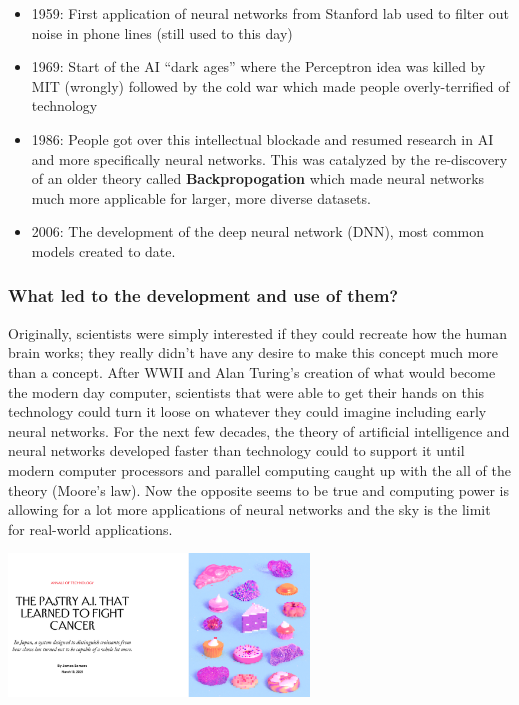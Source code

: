 \documentclass[
]{article}
\providecommand{\tightlist}{%
  \setlength{\itemsep}{0pt}\setlength{\parskip}{0pt}}
\begin{document}
\begin{itemize}
\tightlist
\item
  1959: First application of neural networks from Stanford lab used to
  filter out noise in phone lines (still used to this day)
\item
  1969: Start of the AI ``dark ages'' where the Perceptron idea was
  killed by MIT (wrongly) followed by the cold war which made people
  overly-terrified of technology
\item
  1986: People got over this intellectual blockade and resumed research
  in AI and more specifically neural networks. This was catalyzed by the
  re-discovery of an older theory called \textbf{Backpropogation} which
  made neural networks much more applicable for larger, more diverse
  datasets.
\item
  2006: The development of the deep neural network (DNN), most common
  models created to date.
\end{itemize}

\hypertarget{what-led-to-the-development-and-use-of-them}{%
\subsubsection{What led to the development and use of
them?}\label{what-led-to-the-development-and-use-of-them}}

Originally, scientists were simply interested if they could recreate how
the human brain works; they really didn't have any desire to make this
concept much more than a concept. After WWII and Alan Turing's creation
of what would become the modern day computer, scientists that were able
to get their hands on this technology could turn it loose on whatever
they could imagine including early neural networks. For the next few
decades, the theory of artificial intelligence and neural networks
developed faster than technology could to support it until modern
computer processors and parallel computing caught up with the all of the
theory (Moore's law). Now the opposite seems to be true and computing
power is allowing for a lot more applications of neural networks and the
sky is the limit for real-world applications.

\includegraphics[width=0.6\textwidth,height=\textheight]{media/pastry.png}
\end{document}
